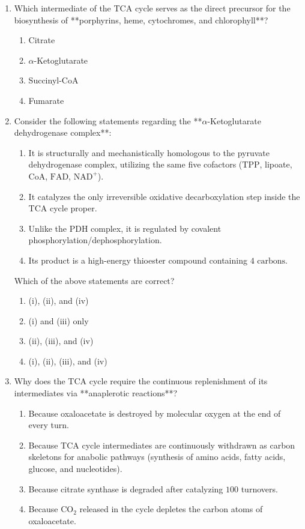 \documentclass[11pt, a4paper]{article}
\begin{document}
\begin{enumerate}[label=\textbf{\arabic*.}]
\item Which intermediate of the TCA cycle serves as the direct precursor for the biosynthesis of **porphyrins, heme, cytochromes, and chlorophyll**?
\begin{enumerate}[label=(\Alph*)]
    \item Citrate
    \item $\alpha$-Ketoglutarate
    \item Succinyl-CoA
    \item Fumarate
\end{enumerate}

\item Consider the following statements regarding the **$\alpha$-Ketoglutarate dehydrogenase complex**:
\begin{enumerate}[label=(\roman*)]
    \item It is structurally and mechanistically homologous to the pyruvate dehydrogenase complex, utilizing the same five cofactors ($\text{TPP}$, lipoate, $\text{CoA}$, $\text{FAD}$, $\text{NAD}^+$).
    \item It catalyzes the only irreversible oxidative decarboxylation step inside the TCA cycle proper.
    \item Unlike the PDH complex, it is regulated by covalent phosphorylation/dephosphorylation.
    \item Its product is a high-energy thioester compound containing $4\text{ carbons}$.
\end{enumerate}
Which of the above statements are correct?
\begin{enumerate}[label=(\Alph*)]
    \item (i), (ii), and (iv)
    \item (i) and (iii) only
    \item (ii), (iii), and (iv)
    \item (i), (ii), (iii), and (iv)
\end{enumerate}

\item Why does the TCA cycle require the continuous replenishment of its intermediates via **anaplerotic reactions**?
\begin{enumerate}[label=(\Alph*)]
    \item Because oxaloacetate is destroyed by molecular oxygen at the end of every turn.
    \item Because TCA cycle intermediates are continuously withdrawn as carbon skeletons for anabolic pathways (synthesis of amino acids, fatty acids, glucose, and nucleotides).
    \item Because citrate synthase is degraded after catalyzing $100$ turnovers.
    \item Because $\text{CO}_2$ released in the cycle depletes the carbon atoms of oxaloacetate.
\end{enumerate}


\end{enumerate}
\end{document}
